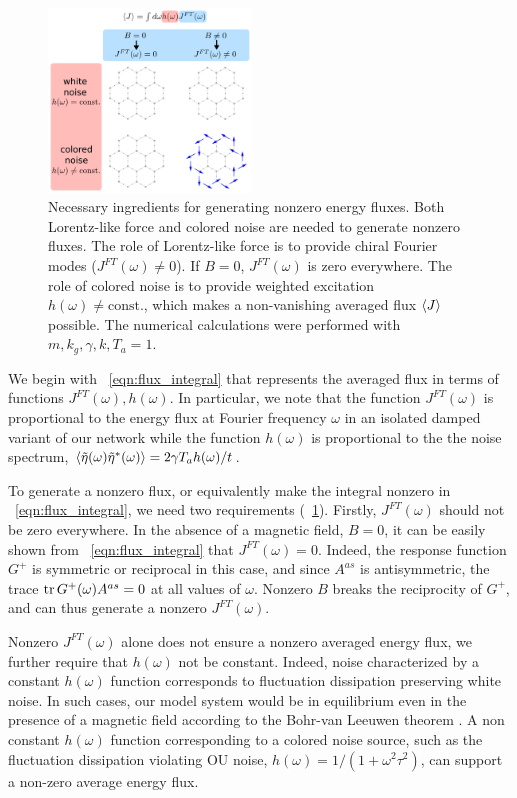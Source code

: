 \documentclass[
 preprint,
 preprintnumbers,
 amsmath,amssymb,
 aps,
 pre,
 longbibliography,
 superscriptaddress,
 10pt, twocolumn
]{revtex4-1}
\begin{document}
\begin{figure}[tbp]
	\centering
	\includegraphics[width=0.48\textwidth]{ingredients.pdf}
    \caption{
    Necessary ingredients for generating nonzero energy fluxes.
    Both Lorentz-like force and colored noise are needed to generate nonzero fluxes.
    The role of Lorentz-like force is to provide chiral Fourier modes ($J^{FT}(\omega)\neq 0$). If $B=0$, $J^{FT}(\omega)$ is zero everywhere. 
    The role of colored noise is to provide weighted excitation $h(\omega)\neq \text{const.}$, which makes a non-vanishing averaged flux $\expval{J}$ possible.
    The numerical calculations were performed with $m,k_g,\gamma,k, T_a=1$. 
    }
    \label{fig:ingredients}
\end{figure}
We begin with \eqnname~\eqref{eqn:flux_integral} that represents the averaged flux in terms of functions $J^{FT}(\omega), h(\omega)$. In particular, we note that the function $J^{FT}(\omega)$ is proportional to the energy flux at Fourier frequency $\omega$ in an isolated damped variant of our network while the function $h(\omega)$ is proportional to the the noise spectrum, $\expval{\tilde{\eta}(\omega)\tilde{\eta}^*(\omega)} = 2\gamma T_a h(\omega) / t$.

To generate a nonzero flux, or equivalently make the integral nonzero in \eqnname~\eqref{eqn:flux_integral}, we need two requirements (\figurename~\ref{fig:ingredients}).
Firstly, $J^{FT}(\omega)$ should not be zero everywhere.
In the absence of a magnetic field, $B=0$, it can be easily shown from \eqnname~\ref{eqn:flux_integral} that $J^{FT}(\omega)=0$. Indeed, the response function $G^+$ is symmetric or reciprocal in this case, and since $A^{as}$ is antisymmetric, the trace $\tr G^+(\omega) A^{as}=0$ at all values of $\omega$. Nonzero $B$ breaks the reciprocity of $G^+$, and can thus generate a nonzero $J^{FT}(\omega)$. 

Nonzero $J^{FT}(\omega)$ alone does not ensure a nonzero averaged energy flux, we further require that $h(\omega)$ not be constant.
Indeed, noise characterized by a constant $h(\omega)$ function corresponds to fluctuation dissipation preserving white noise. In such cases, our model system would be in equilibrium even in the presence of a magnetic field according to the Bohr-van Leeuwen theorem \cite{Pradhan2010NonexistenceClassical}.
A non constant $h(\omega)$ function corresponding to a colored noise source, such as the fluctuation dissipation violating OU noise, $h(\omega)=1/(1+\omega^2\tau^2)$, can support a non-zero average energy flux. 
\end{document}
